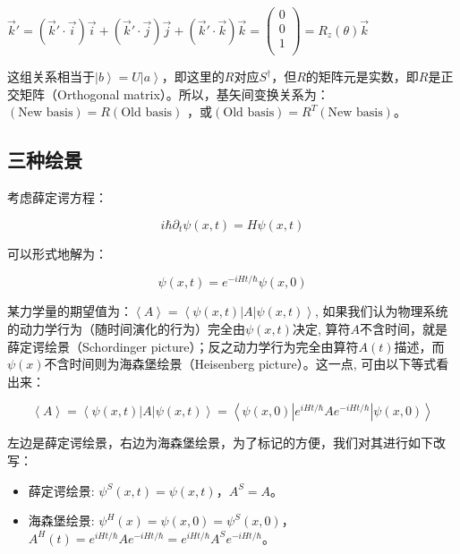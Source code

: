 $\vec k' = ( \vec k' \cdot \vec i ) \vec i + ( \vec k' \cdot \vec j
) \vec j + ( \vec k' \cdot \vec k ) \vec k = \left( \begin{array}{l}
 0 \\
 0 \\
 1 \\
 \end{array} \right) = R_z
(\theta) \vec k$



这组关系相当于$\left| b \right\rangle  = U\left| a \right\rangle
$，即这里的$R$对应$S^{\dagger}$，但$R$的矩阵元是实数，即$R$是正交矩阵（Orthogonal
matrix）。所以，基矢间变换关系为：$( \text{New basis} ) = R (
\text{Old basis} )$ ，或$( \text{Old basis} ) = R^T ( \text{New
basis} )$。


\subsection{三种绘景}


考虑薛定谔方程：

\begin{equation*}
    i \hbar \partial_t \psi(x,t)=H \psi(x,t)
\end{equation*}

可以形式地解为：

\begin{equation*}
    \psi(x,t)=e^{-iHt/\hbar} \psi(x,0)
\end{equation*}


某力学量的期望值为：$\left< A \right> = \left< \psi(x,t) | A |
\psi(x,t)\right>$,
如果我们认为物理系统的动力学行为（随时间演化的行为）完全由$\psi(x,t)$决定,
算符$A$不含时间，就是薛定谔绘景（Schordinger
picture）；反之动力学行为完全由算符$A(t)$描述，而$\psi(x)$不含时间则为海森堡绘景（Heisenberg
picture）。这一点, 可由以下等式看出来：



\begin{equation*}
    \left< A \right> = \left< \psi(x,t) | A | \psi(x,t)\right> = \left<
\psi(x,0) | e^{iHt/\hbar}Ae^{-iHt/\hbar} | \psi(x,0) \right>
\end{equation*}


左边是薛定谔绘景，右边为海森堡绘景，为了标记的方便，我们对其进行如下改写：


\begin{itemize}
  \item 薛定谔绘景: $\psi^S(x,t) = \psi(x,t)$，$A^S =
A$。
  \item 海森堡绘景: $\psi^H(x)=\psi(x,0)=\psi^S(x,0)$，$A^H(t) =
e^{iHt/\hbar}Ae^{-iHt/\hbar}=e^{iHt/\hbar}A^Se^{-iHt/\hbar}$。
\end{itemize}



